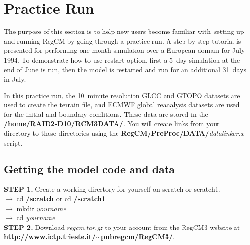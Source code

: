 \section{Practice Run}
The purpose of this section is to help new users become familiar with setting up and running RegCM by going through a practice run.  A step-by-step tutorial is presented for performing one-month simulation over a European domain for July 1994.  To demonstrate how to use restart option, first a 5~day simulation at the end of June is run, then the model is restarted and run for an additional 31~days in July.

In this practice run, the 10~minute resolution GLCC and GTOPO datasets are used to create the terrain file, and ECMWF global reanalysis datasets are used for the initial and boundary conditions. These data are stored in the {\bf /home/RAID2-D10/RCM3DATA/}.  You will create links from your directory to these directories using the {\bf RegCM/PreProc/DATA/}{\it datalinker.x} script. 


\subsection{Getting the model code and data}

\indent
{\bf STEP 1.}  Create a working directory for yourself on scratch or scratch1. \\

\indent 
$\rightarrow$ cd {\bf /scratch} or cd {\bf /scratch1} \\
\indent
$\rightarrow$ mkdir {\it yourname} \\
\indent
$\rightarrow$ cd {\it yourname} \\

\noindent
{\bf STEP 2.}  Download {\it regcm.tar.gz} to your account from the RegCM3 website at \\
{\bf http://www.ictp.trieste.it/$\sim$pubregcm/RegCM3/}. \\

